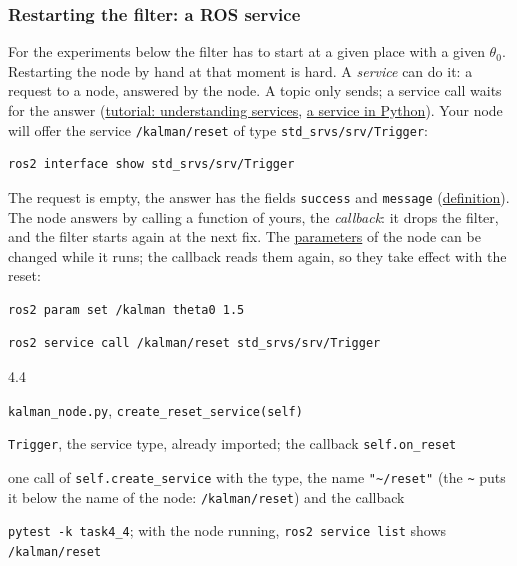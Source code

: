 \documentclass[11pt,a4paper,parskip=half]{scrartcl}
\newcommand{\thema}[1]{\texttt{#1}}
\newcommand{\datei}[1]{\texttt{#1}}
\newcommand{\todorow}[2]{\par\noindent\raggedright\hangindent=1.6cm\hangafter=1\makebox[1.6cm][l]{\color{ohmgrey}#1}#2\par}
\newcommand{\where}[1]{\todorow{where}{#1}}
\newcommand{\given}[1]{\todorow{given}{#1}}
\newcommand{\result}[1]{\todorow{write}{#1}}
\newcommand{\test}[1]{\todorow{test}{#1}}
\begin{document}
\subsubsection*{Restarting the filter: a ROS service}
For the experiments below the filter has to start at a given place with a given \(\theta_0\). Restarting the
node by hand at that moment is hard. A \emph{service} can do it: a request to a node, answered by the node. A
topic only sends; a service call waits for the answer
(\href{https://docs.ros.org/en/jazzy/Tutorials/Beginner-CLI-Tools/Understanding-ROS2-Services/Understanding-ROS2-Services.html}{tutorial: understanding services},
\href{https://docs.ros.org/en/jazzy/Tutorials/Beginner-Client-Libraries/Writing-A-Simple-Py-Service-And-Client.html}{a service in Python}). Your node will offer the service \thema{/kalman/reset}
of type \thema{std\_srvs/srv/Trigger}:
\begin{lstlisting}
ros2 interface show std_srvs/srv/Trigger
\end{lstlisting}
The request is empty, the answer has the fields \thema{success} and \thema{message}
(\href{https://github.com/ros2/common_interfaces/blob/jazzy/std_srvs/srv/Trigger.srv}{definition}). The node answers by
calling a function of yours, the \emph{callback}: it drops the filter, and the filter starts again at the next
fix. The \href{https://docs.ros.org/en/jazzy/Tutorials/Beginner-CLI-Tools/Understanding-ROS2-Parameters/Understanding-ROS2-Parameters.html}{parameters}
of the node can be changed while it runs; the callback reads them again, so they take effect with the reset:
\begin{lstlisting}
ros2 param set /kalman theta0 1.5
\end{lstlisting}
\begin{lstlisting}
ros2 service call /kalman/reset std_srvs/srv/Trigger
\end{lstlisting}

\begin{todo}{4.4}
\where{\datei{kalman\_node.py}, \thema{create\_reset\_service(self)}}
\given{\thema{Trigger}, the service type, already imported; the callback \thema{self.on\_reset}}
\result{one call of \thema{self.create\_service} with the type, the name \thema{"\textasciitilde/reset"} (the
       \thema{\textasciitilde} puts it below the name of the node: \thema{/kalman/reset}) and the callback}
\test{\thema{pytest -k task4\_4}; with the node running, \thema{ros2 service list} shows
      \thema{/kalman/reset}}
\end{todo}
\end{document}
